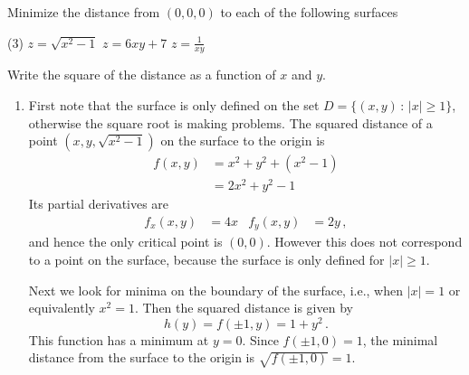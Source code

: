 \begin{question}
Minimize the distance from $(0,0,0)$ to each of the following surfaces
\begin{tasks}(3)
\task
$z = \displaystyle\sqrt{x^2-1}$
\task
$z= 6xy+7$
\task
$z=\displaystyle\frac{1}{xy}$
\end{tasks}
\begin{hint*}
Write the square of the distance as a function of $x$ and $y$.
\end{hint*}
\end{question}

\begin{solution}
\begin{enumerate}
\item
First note that the surface is only defined on the set
$D = \{ (x,y) \,:\, |x| \geq 1 \}$,
otherwise the square root is making problems. The squared distance of a point 
$\left(x, y, \sqrt{x^2-1}\right)$ on the surface to the origin is
\begin{align*}
f(x,y) &= x^2 + y^2 + \left(x^2 - 1\right) \\
&= 2x^2 + y^2 -1
\end{align*}
Its partial derivatives are
\begin{align*}
f_x(x,y) &= 4x &
f_y(x,y) &= 2y\,,
\end{align*}
and hence the only critical point is $(0,0)$. However this does not correspond to a point on the surface, because the surface is only defined for $|x| \geq 1$.

Next we look for minima on the boundary of the surface, i.e., when $|x|=1$ or equivalently $x^2 = 1$. Then the squared distance is given by
\[
h(y) = f(\pm 1, y) =1 + y^2\,.
\]
This function has a minimum at $y=0$. Since $f(\pm 1, 0) = 1$, the minimal distance from the surface to the origin is $\sqrt{f(\pm 1, 0)} = 1$.


\end{enumerate}
\end{solution}
